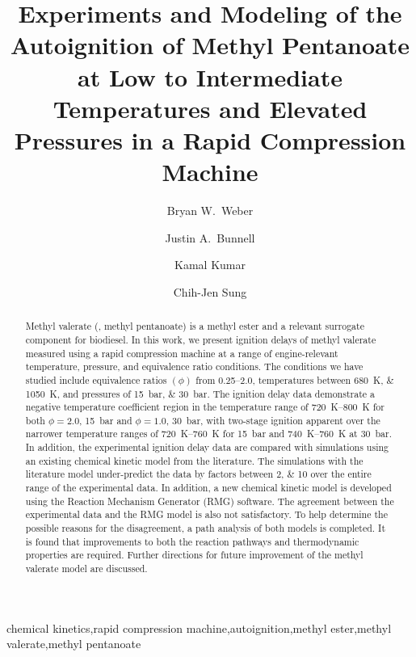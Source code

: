 \documentclass[letterpaper, review, sort&compress]{elsarticle}
\begin{document}
\begin{frontmatter}
\title{ Experiments and Modeling of the Autoignition of Methyl Pentanoate at Low to Intermediate Temperatures and Elevated Pressures in a Rapid Compression Machine }

\author[uconn]{Bryan W.\ Weber}
\author[uconn]{Justin A.\ Bunnell}
\author[idaho]{Kamal Kumar}
\author[uconn]{Chih-Jen Sung}
\address[uconn]{Department of Mechanical Engineering, University of Connecticut, Storrs, CT, USA}
\address[idaho]{Department of Mechanical Engineering, University of Idaho, Moscow, ID, USA}

\begin{abstract} %

    Methyl valerate (, methyl pentanoate) is a methyl ester and a relevant surrogate
    component for biodiesel. In this work, we present ignition delays of methyl valerate measured
    using a rapid compression machine at a range of engine-relevant temperature, pressure, and
    equivalence ratio conditions. The conditions we have studied include equivalence ratios
    \((\phi)\) from \numrange{0.25}{2.0}, temperatures between \SIlist{680;1050}{\K}, and pressures
    of \SIlist{15;30}{\bar}. The ignition delay data demonstrate a negative temperature coefficient
    region in the temperature range of \SIrange[range-phrase={--}]{720}{800}{\K} for both
    \(\phi=2.0\), \SI{15}{\bar} and \(\phi=1.0\), \SI{30}{\bar}, with two-stage ignition apparent
    over the narrower temperature ranges of \SIrange[range-phrase={--}]{720}{760}{\K} for
    \SI{15}{\bar} and \SIrange[range-phrase={--}]{740}{760}{\K} at \SI{30}{\bar}. In addition, the
    experimental ignition delay data are compared with simulations using an existing chemical
    kinetic model from the literature. The simulations with the literature model under-predict the
    data by factors between \numlist{2;10} over the entire range of the experimental data. In
    addition, a new chemical kinetic model is developed using the Reaction Mechanism Generator (RMG)
    software. The agreement between the experimental data and the RMG model is also not
    satisfactory. To help determine the possible reasons for the disagreement, a path analysis of
    both models is completed. It is found that improvements to both the reaction pathways and
    thermodynamic properties are required. Further directions for future improvement of the methyl
    valerate model are discussed.

\end{abstract}

\begin{keyword}
    chemical kinetics\sep rapid compression machine\sep autoignition\sep methyl ester\sep methyl valerate\sep methyl pentanoate
\end{keyword}
\end{frontmatter}
\end{document}

